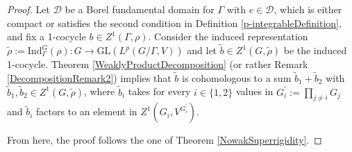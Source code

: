 \documentclass[a4paper,11pt,reqno]{amsart}
\numberwithin{equation}{section}
\theoremstyle{definition}
\theoremstyle{remark}
\theoremstyle{remark}
\begin{document}
\begin{proof} Let $\mathcal{D}$ be a Borel fundamental domain for $\Gamma$ with $e\in\mathcal{D}$, which is either compact or satisfies the second condition in Definition \ref{p-integrableDefinition}, and fix a 1-cocycle $b\in Z^{1}(\Gamma,\rho)$. Consider the induced representation $\widetilde{\rho}:=\text{Ind}_{\Gamma}^{G}(\rho):G\rightarrow\text{GL}(L^{p}(G/\Gamma,V))$ and let $\widetilde{b}\in Z^{1}(G,\widetilde{\rho})$ be the induced 1-cocycle. Theorem \ref{WeaklyProductDecomposition} (or rather Remark \ref{DecompositionRemark2}) implies that $\widetilde{b}$ is cohomologous to a sum $\widetilde{b}_{1}+\widetilde{b}_{2}$ with $\widetilde{b}_{1},\widetilde{b}_{2}\in Z^{1}(G,\widetilde{\rho})$, where $\widetilde{b}_{i}$ takes for every $i\in\{1,2\}$ values in $G_{i}^{\prime}:=\prod_{j\neq i}G_{j}$ and $\widetilde{b}_{i}$ factors to an element in $Z^{1}(G_{i},V^{G_{i}^{\prime}})$. 

From here, the proof follows the one of Theorem \ref{NowakSuperrigidity}. \end{proof}

\vspace{3mm}

\end{document}
